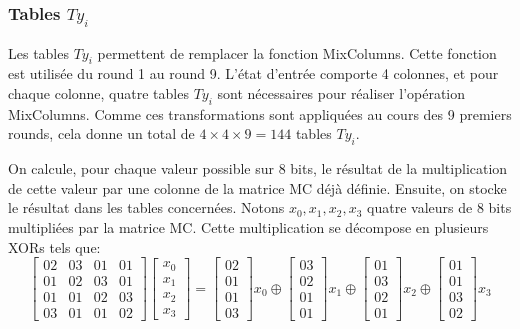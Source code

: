 \documentclass[a4paper, 10pt]{article}
\begin{document}
  \subsubsection{Tables \(Ty_{i}\)}
  \label{sec:tyi}
  \normalsize
  Les tables \(Ty_{i}\) permettent de remplacer la fonction MixColumns. Cette fonction est utilisée du round 1 au round 9. 
  L’état d’entrée comporte 4 colonnes, et pour chaque colonne, quatre tables \(Ty_{i}\) sont nécessaires pour 
  réaliser l’opération MixColumns. Comme ces transformations sont appliquées au cours des 9 premiers rounds, 
  cela donne un total de $4 \times 4 \times 9 = 144$ tables \(Ty_{i}\).

  On calcule, pour chaque valeur possible sur 8 bits, le résultat de la multiplication de cette valeur par 
  une colonne de la matrice MC déjà définie. Ensuite, on stocke le résultat dans les tables concernées.
  Notons \(x_{0}, x_{1}, x_{2}, x_{3}\) quatre valeurs de 8 bits multipliées par la matrice MC. Cette multiplication 
  se décompose en plusieurs XORs tels que:
  \[
\begin{bmatrix}
02 & 03 & 01 & 01 \\
01 & 02 & 03 & 01 \\
01 & 01 & 02 & 03 \\
03 & 01 & 01 & 02
\end{bmatrix}
\begin{bmatrix}
x_0 \\
x_1 \\
x_2 \\
x_3
\end{bmatrix}
=
\begin{bmatrix}
02 \\
01 \\
01 \\
03
\end{bmatrix} x_0
\oplus
\begin{bmatrix}
03 \\
02 \\
01 \\
01
\end{bmatrix} x_1
\oplus
\begin{bmatrix}
01 \\
03 \\
02 \\
01
\end{bmatrix} x_2
\oplus
\begin{bmatrix}
01 \\
01 \\
03 \\
02
\end{bmatrix} x_3
\]
\end{document}
